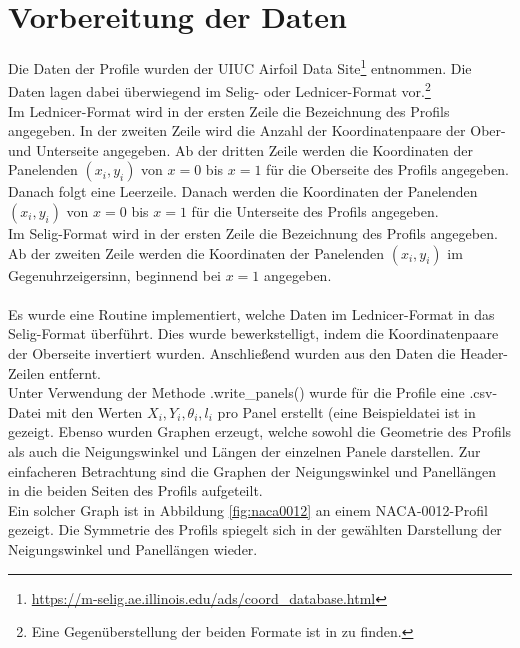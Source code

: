 \section{Vorbereitung der Daten}
Die Daten der Profile wurden der UIUC Airfoil Data Site\footnote{\url{https://m-selig.ae.illinois.edu/ads/coord_database.html}} entnommen. Die Daten lagen dabei überwiegend im Selig- oder Lednicer-Format vor.\footnote{Eine Gegenüberstellung der beiden Formate ist in  zu finden.}
\\
Im Lednicer-Format wird in der ersten Zeile die Bezeichnung des Profils angegeben. In der zweiten Zeile wird die Anzahl der Koordinatenpaare der Ober- und Unterseite angegeben. Ab der dritten Zeile werden die Koordinaten der Panelenden $(x_i,y_i)$ von $x=0$ bis $x=1$ für die Oberseite des Profils angegeben. Danach folgt eine Leerzeile. Danach werden die Koordinaten der Panelenden $(x_i,y_i)$ von $x=0$ bis $x=1$ für die Unterseite des Profils angegeben.
\\
Im Selig-Format wird in der ersten Zeile die Bezeichnung des Profils angegeben. Ab der zweiten Zeile werden die Koordinaten der Panelenden $(x_i,y_i)$ im Gegenuhrzeigersinn, beginnend bei $x=1$ angegeben.
\\\\
Es wurde eine Routine implementiert, welche Daten im Lednicer-Format in das Selig-Format überführt. Dies wurde bewerkstelligt, indem die Koordinatenpaare der Oberseite invertiert wurden. Anschließend wurden aus den Daten die Header-Zeilen entfernt. \\
Unter Verwendung der Methode .write\_panels() wurde für die Profile eine .csv-Datei mit den Werten $X_i, Y_i, \theta _i, l_i$ pro Panel erstellt (eine Beispieldatei ist in  gezeigt. Ebenso wurden Graphen erzeugt, welche sowohl die Geometrie des Profils als auch die Neigungswinkel und Längen der einzelnen Panele darstellen. Zur einfacheren Betrachtung sind die Graphen der Neigungswinkel und Panellängen in die beiden Seiten des Profils aufgeteilt. 
\\Ein solcher Graph ist in Abbildung \ref{fig:naca0012} an einem NACA-0012-Profil gezeigt. Die Symmetrie des Profils spiegelt sich in der gewählten Darstellung der Neigungswinkel und Panellängen wieder.


